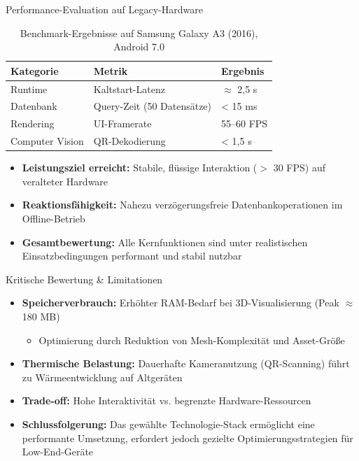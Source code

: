 \documentclass[10pt]{beamer}
\begin{document}
\begin{frame}{Performance-Evaluation auf Legacy-Hardware}
    \begin{table}
        \centering
        \caption{Benchmark-Ergebnisse auf Samsung Galaxy A3 (2016), Android 7.0}
        \begin{tabular}{lll}
            \toprule
            \textbf{Kategorie} & \textbf{Metrik} & \textbf{Ergebnis} \\
            \midrule
            Runtime & Kaltstart-Latenz & $\approx$ 2{,}5 s \\
            Datenbank & Query-Zeit (50 Datensätze) & < 15 ms \\
            Rendering & UI-Framerate & 55--60 FPS \\
            Computer Vision & QR-Dekodierung & < 1{,}5 s \\
            \bottomrule
        \end{tabular}
    \end{table}
    
    \begin{itemize}
        \item \textbf{Leistungsziel erreicht:} Stabile, flüssige Interaktion ($>$ 30 FPS) auf veralteter Hardware
        
        \item \textbf{Reaktionsfähigkeit:} Nahezu verzögerungsfreie Datenbankoperationen im Offline-Betrieb
        
        \item \textbf{Gesamtbewertung:} Alle Kernfunktionen sind unter realistischen Einsatzbedingungen performant und stabil nutzbar
    \end{itemize}
\end{frame}


\begin{frame}{Kritische Bewertung \& Limitationen}
    \begin{itemize}
        \item \textbf{Speicherverbrauch:}
        Erhöhter RAM-Bedarf bei 3D-Visualisierung (Peak $\approx$ 180 MB)
        \begin{itemize}
            \item Optimierung durch Reduktion von Mesh-Komplexität und Asset-Größe
        \end{itemize}
        
        \item \textbf{Thermische Belastung:}
        Dauerhafte Kameranutzung (QR-Scanning) führt zu Wärmeentwicklung auf Altgeräten
        
        \item \textbf{Trade-off:}
        Hohe Interaktivität vs. begrenzte Hardware-Ressourcen
        
        \item \textbf{Schlussfolgerung:}
        Das gewählte Technologie-Stack ermöglicht eine performante Umsetzung, erfordert jedoch gezielte Optimierungsstrategien für Low-End-Geräte
    \end{itemize}
\end{frame}
\end{document}
